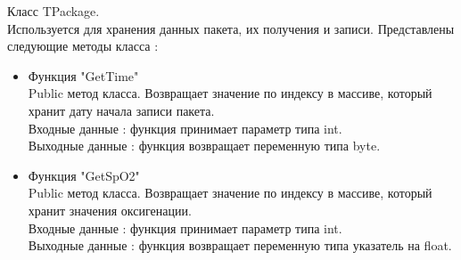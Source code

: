 \documentclass[a4document]{article}
\begin{document}
{\begin{itemize}
        \bigbreak
        Класс TPackage. \\
        Используется для хранения данных пакета, их получения и записи.
        Представлены следующие методы класса : 
            \begin{itemize}
                \item Функция "GetTime" \\
                    Public метод класса. Возвращает значение по индексу в массиве, который хранит дату начала записи пакета. \\ 
                    Входные данные : функция принимает параметр типа int. \\
                    Выходные данные : функция возвращает переменную типа byte.
                \newpage
                \item Функция "GetSpO2" \\
                    Public метод класса. Возвращает значение по индексу в массиве, который хранит значения оксигенации. \\ 
                    Входные данные : функция принимает параметр типа int. \\
                    Выходные данные : функция возвращает переменную типа указатель на float.
                

\end{itemize}
\end{itemize}}
\end{document}
